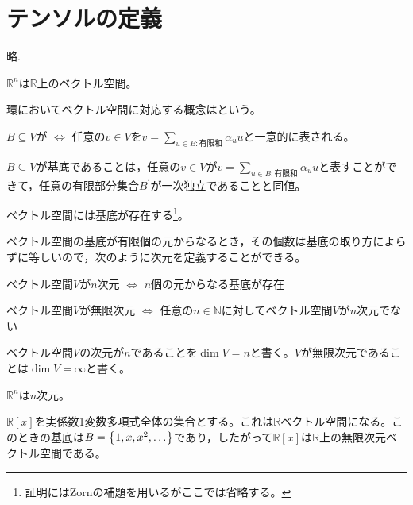 \documentclass[uplatex]{jsarticle}
\begin{document}
\fi

\section{テンソルの定義}
\begin{teigi}[ベクトル空間]
  略.
\end{teigi}

\begin{rei}
  $\mathbb{R}^{n}$は$\mathbb{R}$上のベクトル空間。
\end{rei}

環においてベクトル空間に対応する概念はという。

\begin{teigi}[基底]
  $B \subseteq V$が $\iff$ 任意の$v \in V$を${\displaystyle v = \sum_{u \in B: \text{有限和}} \alpha_{u} u}$と一意的に表される。
\end{teigi}

$B \subseteq V$が基底であることは，任意の$v \in V$が${\displaystyle v = \sum_{u \in B: \text{有限和}} \alpha_{u} u}$と表すことができて，任意の有限部分集合$B^{\prime}$が一次独立であることと同値。

\begin{hodai}
  ベクトル空間には基底が存在する\footnote{証明にはZornの補題を用いるがここでは省略する。}。
\end{hodai}

ベクトル空間の基底が有限個の元からなるとき，その個数は基底の取り方によらずに等しいので，次のように次元を定義することができる。
\begin{teigi}
  ベクトル空間$V$が$n$次元 $\iff$ $n$個の元からなる基底が存在\par
  ベクトル空間$V$が無限次元 $\iff$ 任意の$n \in \mathbb{N}$に対してベクトル空間$V$が$n$次元でない
\end{teigi}
ベクトル空間$V$の次元が$n$であることを$\dim V = n$と書く。$V$が無限次元であることは$\dim V = \infty$と書く。

\begin{rei}
  $\mathbb{R}^{n}$は$n$次元。
\end{rei}

\begin{rei}
  $\mathbb{R}[x]$を実係数1変数多項式全体の集合とする。これは$\mathbb{R}$ベクトル空間になる。このときの基底は$B = \Set{\hspace{-1.8pt} 1, x, x^{2}, \dots \hspace{-1.8pt}}$であり，したがって$\mathbb{R}[x]$は$\mathbb{R}$上の無限次元ベクトル空間である。
\end{rei}
\end{document}
